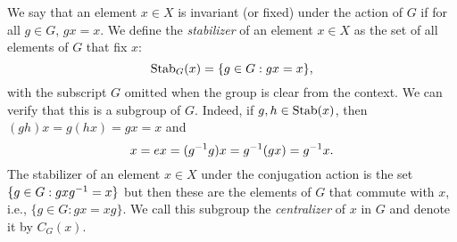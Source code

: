 We say that an element \(x \in X\) is invariant (or fixed) under the action of
\(G\) if for all \(g \in G\), \(gx = x\). We define the \emph{stabilizer} of an
element \(x \in X\) as the set of all elements of \(G\) that fix \(x\):
\[
    \operatorname{Stab}_G(x) = \{g \in G : gx = x\},
\]
with the subscript \(G\) omitted when the group is clear from the context. We
can verify that this is a subgroup of \(G\). Indeed, if \(g, h \in \operatorname{Stab}(x)\),
then \((gh)x = g(hx) = gx = x\) and 
\[
    x = ex = (g^{-1} g)x = g^{-1}(gx) = g^{-1} x.
\]
The stabilizer of an element \(x \in X\) under the conjugation action is the set
\(\{g \in G : gxg^{-1} = x\}\) but then these are the elements of \(G\) that
commute with \(x\), i.e., \(\{g \in G : gx = xg\}\). We call this subgroup the
\emph{centralizer} of \(x\) in \(G\) and denote it by \(C_G(x)\). 



